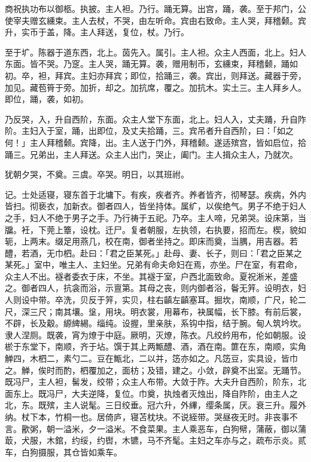 \documentclass[]{article}
\begin{document}
商祝执功布以御柩。执披。主人袒。乃行。踊无算。出宫，踊，袭。至于邦门，公使宰夫赠玄纁束。主人去杖，不哭，由左听命。宾由右致命。主人哭，拜稽颡。宾升，实币于盖，降。主人拜送，复位，杖。乃行。

至于圹。陈器于道东西，北上。茵先入。属引。主人袒。众主人西面，北上。妇人东面。皆不哭。乃窆。主人哭，踊无算。袭，赠用制币，玄纁束，拜稽颡，踊如初。卒，袒，拜宾。主妇亦拜宾；即位，拾踊三，袭。宾出，则拜送。藏器于旁，加见。藏苞筲于旁。加折，却之。加抗席，覆之。加抗木。实土三。主人拜乡人。即位，踊，袭，如初。

乃反哭，入，升自西阶，东面。众主人堂下东面，北上。妇人入，丈夫踊，升自阼阶。主妇入于室，踊，出即位，及丈夫拾踊，三。宾吊者升自西阶，曰：「如之何！」主人拜稽颡。宾降，出。主人送于门外，拜稽颡。遂适殡宫，皆如启位，拾踊三。兄弟出，主人拜送。众主人出门，哭止，阖门。主人揖众主人，乃就次。

犹朝夕哭，不奠。三虞。卒哭。明日，以其班祔。

记。士处适寝，寝东首于北墉下。有疾，疾者齐。养者皆齐，彻琴瑟。疾病，外内皆扫。彻亵衣，加新衣。御者四人，皆坐持体。属纩，以俟绝气。男子不绝于妇人之手，妇人不绝于男子之手。乃行祷于五祀。乃卒。主人啼，兄弟哭。设床第，当牖。衽，下莞上簟，设枕。迁尸。复者朝服，左执领，右执要，招而左。楔，貌如轭，上两末。缀足用燕几，校在南，御者坐持之。即床而奠，当腢，用吉器。若醴，若酒，无巾柶。赴曰：「君之臣某死。」赴母、妻、长子，则曰：「君之臣某之某死。」室中，唯主人、主妇坐。兄弟有命夫命妇在焉，亦坐。尸在室，有君命，众主人不出。襚者委衣于床，不坐。其襚于室，户西北面致命。夏祝淅米，差盛之。御者四人，抗衾而浴，示亶第。其母之丧，则内御者浴，鬠无笄。设明衣，妇人则设中带。卒洗，贝反于笄，实贝，柱右齻左齻塞耳。掘坎，南顺，广尺，轮二尺，深三尺；南其壤。垼，用块。明衣裳，用幕布，袂属幅，长下膝。有前后裳，不辟，长及觳。縓綼緆。缁纯。设握，里亲肤，系钩中指，结于腕。甸人筑坅坎。隶人涅厕。既袭，宵为燎于中庭。厥明，灭燎，陈衣。凡绞紟用布，伦如朝服。设棜于东堂下，南顺，齐于坫。馔于其上两甒醴、酒，酒在南。篚在东，南顺，实角觯四，木柶二，素勺二。豆在甒北，二以并，笾亦如之。凡笾豆，实具设，皆巾之。觯，俟时而酌，柶覆加之，面枋；及错，建之。小敛，辟奠不出室。无踊节。既冯尸，主人袒，髺发，绞带；众主人布带。大敛于阼。大夫升自西阶，阶东，北面东上。既冯尸，大夫逆降，复位。巾奠，执烛者灭烛出，降自阼阶，由主人之北，东。既殡，主人说髦。三日绞垂。冠六升，外縪，缨条属，厌。衰三升。履外纳。杖下本，竹桐一也。居倚庐，寝苫枕块。不说絰带。哭昼夜无时。非丧事不言。歠粥，朝一溢米，夕一溢米。不食菜果。主人乘恶车，白狗幦，蒲蔽，御以蒲菆，犬服，木錧，约绥，约辔，木镳，马不齐髦。主妇之车亦与之，疏布示炎。贰车，白狗摄服，其仓皆如乘车。
\end{document}
